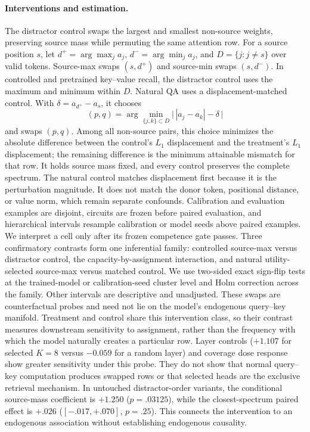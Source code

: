 \documentclass[letterpaper]{article} %
\begin{document}
\paragraph{Interventions and estimation.}
The distractor control swaps the largest and smallest non-source weights, preserving source mass while
permuting the same attention row. For a source position $s$, let $d^+=\arg\max_j a_j$,
$d^-=\arg\min_j a_j$, and $D=\{j:j\ne s\}$ over valid tokens. Source-max swaps $(s,d^+)$ and source-min
swaps $(s,d^-)$. In controlled and pretrained key--value recall, the distractor control uses the maximum and
minimum within $D$. Natural QA uses a displacement-matched control. With
$\delta=a_{d^+}-a_s$, it chooses
\begin{equation}
 (p,q)=\arg\min_{\{j,k\}\subset D}
 \big\vert\,|a_j-a_k|-\delta\,\big\vert
 \label{eq:matched-control}
\end{equation}
and swaps $(p,q)$. Among all non-source pairs, this choice minimizes the absolute difference between the
control's $L_1$ displacement and the treatment's $L_1$ displacement; the remaining difference is the minimum
attainable mismatch for that row. It holds source mass fixed, and every control preserves the complete spectrum.
The natural control matches displacement first because it is the perturbation magnitude. It does not match the
donor token, positional distance, or value norm, which remain separate confounds. Calibration and
evaluation examples are disjoint, circuits are frozen before paired evaluation, and hierarchical intervals
resample calibration or model seeds above paired examples. We interpret a cell only after its frozen
competence gate passes.
Three confirmatory contrasts form one inferential family: controlled source-max versus distractor control,
the capacity-by-assignment interaction, and natural utility-selected source-max versus matched control. We use
two-sided exact sign-flip tests at the trained-model or calibration-seed cluster level and Holm correction across
the family. Other intervals are descriptive and unadjusted.
These swaps are counterfactual probes and need not lie on the model's endogenous query--key manifold. Treatment
and control share this intervention class, so their contrast measures downstream sensitivity to assignment,
rather than the frequency with which the model naturally creates a particular row. Layer controls ($+1.107$ for
selected $K=8$ versus $-0.059$ for a random layer) and coverage dose response show greater sensitivity under this
probe. They do not show that normal query--key computation produces swapped rows or that selected heads are the
exclusive retrieval mechanism. In untouched distractor-order variants, the conditional source-mass coefficient
is $+1.250$ ($p=.03125$), while the closest-spectrum paired effect is $+.026$ ($[-.017,+.070]$, $p=.25$).
This connects the intervention to an endogenous association without establishing endogenous causality.
\end{document}
